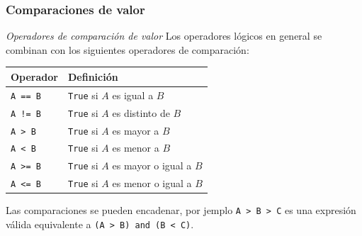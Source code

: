 \documentclass{beamer}
\begin{document}
\begin{frame}[fragile]
    \frametitle{Comparaciones de valor}
    \begin{block}{{\em Operadores de comparación de valor}}
        Los operadores lógicos en general se combinan con los siguientes operadores de comparación:
        \begin{center}
            \begin{table}[]
                \begin{tabular}{@{}ll@{}}
                \toprule
                 Operador &  Definición \\ \midrule
                 \texttt{A == B} & \texttt{True} si $A$ es igual a $B$ \\
                 \texttt{A != B} & \texttt{True} si $A$ es distinto de $B$ \\
                 \texttt{A  > B} & \texttt{True} si $A$ es mayor a $B$ \\
                 \texttt{A  < B} & \texttt{True} si $A$ es menor a $B$ \\
                 \texttt{A >= B} & \texttt{True} si $A$ es mayor o igual a $B$ \\
                 \texttt{A <= B} & \texttt{True} si $A$ es menor o igual a $B$ \\
                 \bottomrule
                \end{tabular}
            \end{table}
        \end{center}
    Las comparaciones se pueden encadenar, por jemplo \texttt{A > B > C} es una expresión válida equivalente a \texttt{(A  > B) and (B < C)}.
    \end{block}
    \end{frame}

\end{document}
